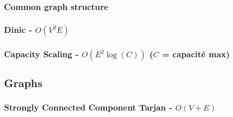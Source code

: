 \documentclass[landscape,a4paper,twocolumn,10pt]{report}
\begin{document}
\subsubsection{Common graph structure}


\subsubsection{Dinic - $O(V^2 E)$}


\subsubsection{Capacity Scaling - $O(E^2 \log(C))$ ($C$ = capacité max)}


\subsection*{Graphs}
\label{graphs}

\subsubsection{Strongly Connected Component Tarjan - $O(V + E)$}

\end{document}
